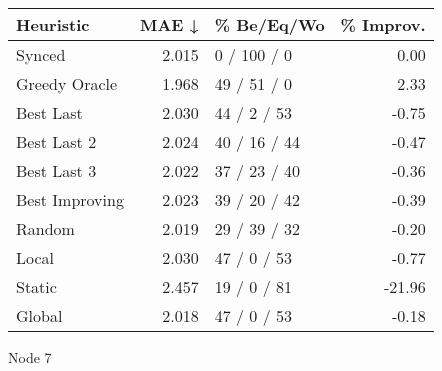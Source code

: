 \begin{tabular}{lrlr}
\toprule
\textbf{Heuristic} & \textbf{MAE ↓} & \textbf{\% Be/Eq/Wo} & \textbf{\% Improv.} \\
\midrule
            Synced &          2.015 &          0 / 100 / 0 &                0.00 \\
     Greedy Oracle &          1.968 &          49 / 51 / 0 &                2.33 \\
         Best Last &          2.030 &          44 / 2 / 53 &               -0.75 \\
       Best Last 2 &          2.024 &         40 / 16 / 44 &               -0.47 \\
       Best Last 3 &          2.022 &         37 / 23 / 40 &               -0.36 \\
    Best Improving &          2.023 &         39 / 20 / 42 &               -0.39 \\
            Random &          2.019 &         29 / 39 / 32 &               -0.20 \\
             Local &          2.030 &          47 / 0 / 53 &               -0.77 \\
            Static &          2.457 &          19 / 0 / 81 &              -21.96 \\
            Global &          2.018 &          47 / 0 / 53 &               -0.18 \\
\bottomrule
\end{tabular}
\caption{Node 7}
\label{tab:hr_non_lr01_le2_bs2_7}
